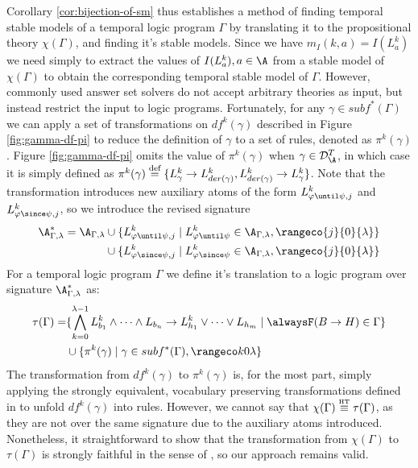 Corollary \ref{cor:bijection-of-sm} thus establishes a method of
finding temporal stable models of a temporal logic program $\Gamma$ by
translating it to the propositional theory $\chi(\Gamma)$, and finding
it's stable models. Since we have $m_I(k,a)=I(L_a^k)$ we need simply
to extract the values of $I(L_a^k), a\in \A$ from a stable model of
$\chi(\Gamma)$ to obtain the corresponding temporal stable model of
$\Gamma$. However, commonly used answer set solvers do not accept
arbitrary theories as input, but instead restrict the input to logic
programs. Fortunately, for any $\gamma \in subf^*(\Gamma)$ we can
apply a set of transformations on $df^k(\gamma)$ described in Figure
\ref{fig:gamma-df-pi} to reduce the definition of $\gamma$ to a set of
rules, denoted as $\pi^k(\gamma)$. Figure \ref{fig:gamma-df-pi} omits
the value of $\pi^k(\gamma)$ when $\gamma \in \mathcal{D}_{\A}^{T}$,
in which case it is simply defined as
$\pi^k(\gamma) \stackrel{\text{def}}{=} \{ L^k_{\gamma} \rightarrow L^k_{der(\gamma)},
L^k_{der(\gamma)} \rightarrow L^k_{\gamma} \}$. Note that the
transformation introduces new auxiliary atoms of the form
$L^k_{\varphi \until \psi,j}$ and $L^k_{\varphi \since \psi,j}$, so we
introduce the revised signature
\begin{align*}
\A_{\Gamma,\lambda}^* = \A_{\Gamma,\lambda} 
&\cup \{ L^k_{\varphi \until \psi,j} \mid L^k_{\varphi \until \psi} \in \A_{\Gamma,\lambda}, \rangeco{j}{0}{\lambda} \}\\
&\cup \{ L^k_{\varphi \since \psi,j} \mid L^k_{\varphi \since \psi} \in \A_{\Gamma,\lambda}, \rangeco{j}{0}{\lambda} \}
\end{align*}
For a temporal logic program $\Gamma$ we define it's translation to a logic
program over signature $\A_{\Gamma,\lambda}^*$ as:
\begin{align*}
  \tau(\Gamma)  = &\{ \bigwedge_{k=0}^{\lambda-1} L_{b_1}^k \land \dots \land L_{b_n}
                    \rightarrow L_{h_1}^k \lor \dots \lor L_{h_m} \mid \tempruleshort \in \Gamma \} \\
                  & \cup \{ \pi^k(\gamma) \mid \gamma \in subf^*(\Gamma), \kinlambda \}
\end{align*}
The transformation from $df^k(\gamma)$ to $\pi^k(\gamma)$ is, for the
most part, simply applying the strongly equivalent, vocabulary
preserving transformations defined in \cite{capeva05a} to unfold
$df^k(\gamma)$ into rules. However, we cannot say that
$\chi(\Gamma) \stackrel{\normalfont\mbox{\tiny HT}}{\equiv} \tau(\Gamma)$, as they are not over the same
signature due to the auxiliary atoms introduced. Nonetheless, it
straightforward to show that the transformation from $\chi(\Gamma)$ to
$\tau(\Gamma)$ is strongly faithful in the sense of \cite{capeva05a},
so our approach remains valid.

